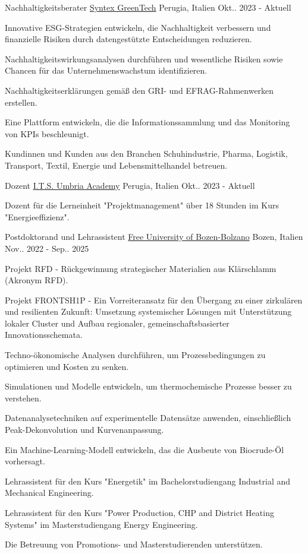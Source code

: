 \begin{cventries}
\cventry
{Nachhaltigkeitsberater}
{\href{https://syntexgreen.tech}{Syntex GreenTech}}
{Perugia, Italien}
{Okt.. 2023 - Aktuell}
{\begin{cvitems}
\item {Innovative ESG-Strategien entwickeln, die Nachhaltigkeit verbessern und finanzielle Risiken durch datengestützte Entscheidungen reduzieren.}
\item {Nachhaltigkeitswirkungsanalysen durchführen und wesentliche Risiken sowie Chancen für das Unternehmenswachstum identifizieren.}
\item {Nachhaltigkeitserklärungen gemäß den GRI- und EFRAG-Rahmenwerken erstellen.}
\item {Eine Plattform entwickeln, die die Informationssammlung und das Monitoring von KPIs beschleunigt.}
\item {Kundinnen und Kunden aus den Branchen Schuhindustrie, Pharma, Logistik, Transport, Textil, Energie und Lebensmittelhandel betreuen.}
\end{cvitems}}

\cventry
{Dozent}
{\href{https://www.itsumbria.it/}{I.T.S. Umbria Academy}}
{Perugia, Italien}
{Okt.. 2023 - Aktuell}
{\begin{cvitems}
\item {Dozent für die Lerneinheit "Projektmanagement" über 18 Stunden im Kurs "Energieeffizienz".}
\end{cvitems}}

\cventry
{Postdoktorand und Lehrassistent}
{\href{https://unibz.it}{Free University of Bozen-Bolzano}}
{Bozen, Italien}
{Nov.. 2022 - Sep.. 2025}
{\begin{cvitems}
\item {Projekt RFD - Rückgewinnung strategischer Materialien aus Klärschlamm (Akronym RFD).}
\item {Projekt FRONTSH1P - Ein Vorreiteransatz für den Übergang zu einer zirkulären und resilienten Zukunft: Umsetzung systemischer Lösungen mit Unterstützung lokaler Cluster und Aufbau regionaler, gemeinschaftsbasierter Innovationsschemata.}
\item {Techno-ökonomische Analysen durchführen, um Prozessbedingungen zu optimieren und Kosten zu senken.}
\item {Simulationen und Modelle entwickeln, um thermochemische Prozesse besser zu verstehen.}
\item {Datenanalysetechniken auf experimentelle Datensätze anwenden, einschließlich Peak-Dekonvolution und Kurvenanpassung.}
\item {Ein Machine-Learning-Modell entwickeln, das die Ausbeute von Biocrude-Öl vorhersagt.}
\item {Lehrassistent für den Kurs "Energetik" im Bachelorstudiengang Industrial and Mechanical Engineering.}
\item {Lehrassistent für den Kurs "Power Production, CHP and District Heating Systems" im Masterstudiengang Energy Engineering.}
\item {Die Betreuung von Promotions- und Masterstudierenden unterstützen.}
\end{cvitems}}


\end{cventries}

